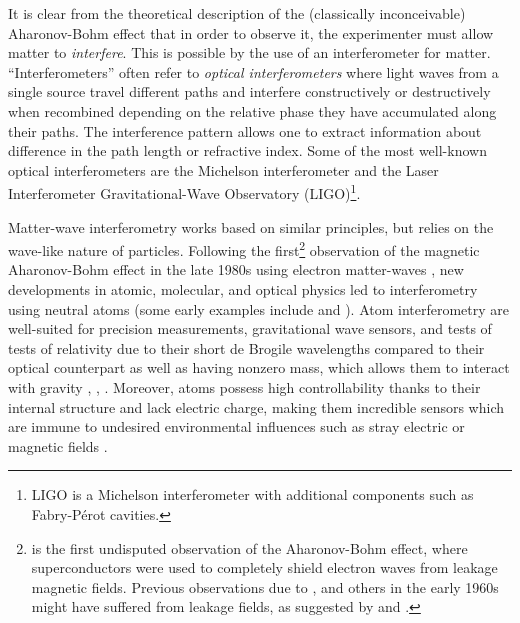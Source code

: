 \documentclass[reprint,
nofootinbib,
amsmath,amssymb,
aps]{revtex4-1}
\begin{document}
It is clear from the theoretical description of the (classically inconceivable) Aharonov-Bohm effect that in order to observe it, the experimenter must allow matter to \textit{interfere}. This is possible by the use of an interferometer for matter. ``Interferometers'' often refer to \textit{optical interferometers} where light waves from a single source travel different paths and interfere constructively or destructively when recombined depending on the relative phase they have accumulated along their paths. The interference pattern allows one to extract information about difference in the path length or refractive index. Some of the most well-known optical interferometers are the Michelson interferometer and the Laser Interferometer Gravitational-Wave Observatory (LIGO)\footnote{LIGO is a Michelson interferometer with additional components such as Fabry-P\'{e}rot cavities.}. 


Matter-wave interferometry works based on similar principles, but relies on the wave-like nature of particles. Following the first\footnote{\cite{tonomura1986evidence} is the first undisputed observation of the Aharonov-Bohm effect, where superconductors were used to completely shield electron waves from leakage magnetic fields. Previous observations due to \cite{chambers1960shift}, \cite{fowler1961electron} and others in the early 1960s might have suffered from leakage fields, as suggested by \cite{bocchieri1978nonexistence} and \cite{roy1980condition}.   } observation of the magnetic Aharonov-Bohm effect in the late 1980s using electron matter-waves \cite{tonomura1986evidence}, new developments in atomic, molecular, and optical physics led to interferometry using neutral atoms (some early examples include \cite{keith1991interferometer} and \cite{carnal1991young}). Atom interferometry are well-suited for precision measurements, gravitational wave sensors, and tests of tests of relativity due to their short de Brogile wavelengths compared to their optical counterpart as well as having nonzero mass, which allows them to interact with gravity \cite{mueller2014quantum}, \cite{dimopoulos2009gravitational}, \cite{stray2022quantum}. Moreover, atoms possess high controllability thanks to their internal structure and lack electric charge, making them incredible sensors which are immune to undesired environmental influences such as stray electric or magnetic fields \cite{bongs2019taking}. 
\end{document}
